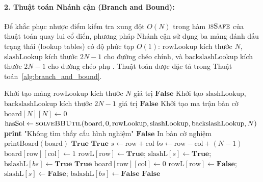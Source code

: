 \documentclass[a4paper,fleqn]{cas-sc}
\begin{document}
\paragraph{2. Thuật toán Nhánh cận (Branch and Bound):}
Để khắc phục nhược điểm kiểm tra xung đột $O(N)$ trong hàm $\Call{isSafe}{}$ của thuật toán quay lui cổ điển, phương pháp Nhánh cận sử dụng ba mảng đánh dấu trạng thái (lookup tables) có độ phức tạp $O(1)$: $\text{rowLookup}$ kích thước $N$, $\text{slashLookup}$ kích thước $2N-1$ cho đường chéo chính, và $\text{backslashLookup}$ kích thước $2N-1$ cho đường chéo phụ \cite{bitner1975backtrack}. Thuật toán được đặc tả trong Thuật toán~\ref{alg:branch_and_bound}.

\begin{algorithm}[htbp]
\caption{Giải bài toán $N$-Queens bằng thuật toán Nhánh cận (Branch and Bound)}
\label{alg:branch_and_bound}
\begin{algorithmic}[1]
    \State Khởi tạo mảng $\text{rowLookup}$ kích thước $N$ giá trị $\mathbf{False}$
    \State Khởi tạo $\text{slashLookup}$, $\text{backslashLookup}$ kích thước $2N-1$ giá trị $\mathbf{False}$
    \State Khởi tạo ma trận bàn cờ $\text{board}[N][N] \gets 0$
    \State $\text{hasSol} \gets \Call{solveBBUtil}{\text{board}, 0, \text{rowLookup}, \text{slashLookup}, \text{backslashLookup}, N}$
        \State \textbf{print} "Không tìm thấy cấu hình nghiệm"
        \State \Return $\mathbf{False}$
    \EndIf
    \State In bàn cờ nghiệm $\text{printBoard}(\text{board})$
    \State \Return $\mathbf{True}$
\EndFunction
\Statex
{}
        \State \Return $\mathbf{True}$
    \EndIf
        \State $s \gets \text{row} + \text{col}$
        \State $bs \gets \text{row} - \text{col} + (N-1)$
            \State $\text{board}[\text{row}][\text{col}] \gets 1$
            \State $\text{rowL}[\text{row}] \gets \mathbf{True}$; $\text{slashL}[s] \gets \mathbf{True}$; $\text{bslashL}[bs] \gets \mathbf{True}$
                \State \Return $\mathbf{True}$
            \EndIf
            \State $\text{board}[\text{row}][\text{col}] \gets 0$ 
            \State $\text{rowL}[\text{row}] \gets \mathbf{False}$; $\text{slashL}[s] \gets \mathbf{False}$; $\text{bslashL}[bs] \gets \mathbf{False}$
        \EndIf
    \EndFor
    \State \Return $\mathbf{False}$
\EndFunction
\end{algorithmic}
\end{algorithm}
\end{document}
